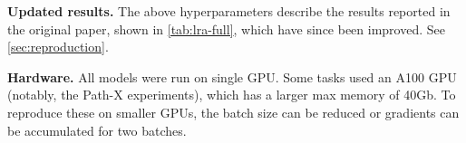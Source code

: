 \textbf{Updated results.}
The above hyperparameters describe the results reported in the original paper, shown in \cref{tab:lra-full}, which have since been improved.
See \cref{sec:reproduction}.

\textbf{Hardware.}
All models were run on single GPU.
Some tasks used an A100 GPU (notably, the Path-X experiments), which has a larger max memory of 40Gb.
To reproduce these on smaller GPUs, the batch size can be reduced or gradients can be accumulated for two batches.

\begin{table*}[!t]
  \caption{
    The values of the best hyperparameters found for classification datasets; LRA (Top) and images/speech (Bottom).
    LR is learning rate and WD is weight decay. BN and LN refer to Batch Normalization and Layer Normalization.
  }
  \label{tab::best-hyperparameters}
  \centering
\end{table*}
